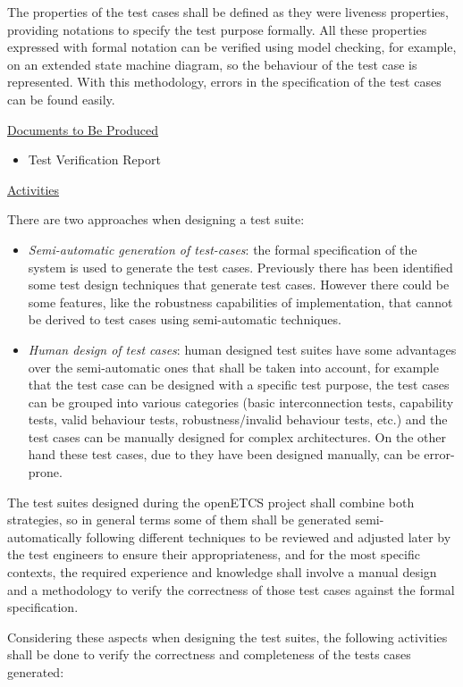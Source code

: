 \documentclass{template/openetcs_report}
\begin{document}
The properties of the test cases shall be defined as they were liveness properties, providing notations to specify the test purpose formally. All these properties expressed with formal notation can be verified using model checking, for example, on an extended state machine diagram, so the behaviour of the test case is represented. With this methodology, errors in the specification of the test cases can be found easily. 

\underline{Documents to Be Produced} 

\begin{itemize}
\item Test Verification Report
\end{itemize}

\underline{Activities}

There are two approaches when designing a test suite:
\begin{itemize}
\item \textit{Semi-automatic generation of test-cases}: the formal specification of the system is used to generate the test cases. Previously there has been identified some test design techniques that generate test cases. However there could be some features, like the robustness capabilities of implementation, that cannot be derived to test cases using semi-automatic techniques.
\item \textit{Human design of test cases}: human designed test suites have some advantages over the semi-automatic ones that shall be taken into account, for example that the test case can be designed with a specific test purpose, the test cases can be grouped into various categories (basic interconnection tests, capability tests, valid behaviour tests, robustness/invalid behaviour tests, etc.) and the test cases can be manually designed for complex architectures. On the other hand these test cases, due to they have been designed manually, can be error-prone.
\end{itemize}

The test suites designed during the openETCS project shall combine both strategies, so in general terms some of them shall be generated semi-automatically following different techniques to be reviewed and adjusted later by the test engineers to ensure their appropriateness, and for the most specific contexts, the required experience and knowledge shall involve a manual design and a methodology to verify the correctness of those test cases against the formal specification.

Considering these aspects when designing the test suites, the following activities shall be done to verify the correctness and completeness of the tests cases generated:
\end{document}
